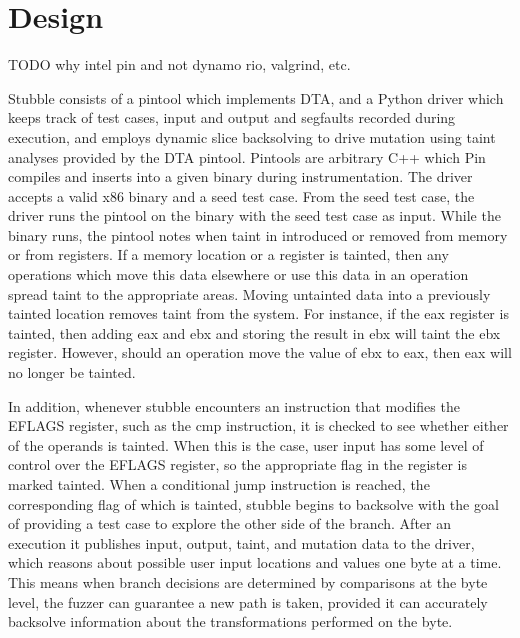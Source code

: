\documentclass[11pt,expanded,copyright]{fsuthesis}
\begin{document}
\section{Design}

TODO why intel pin and not dynamo rio, valgrind, etc.

Stubble consists of a pintool which implements DTA, and a Python driver which keeps track of test cases, input and output and segfaults recorded during execution, and employs dynamic slice backsolving to drive mutation using taint analyses provided by the DTA pintool. Pintools are arbitrary C++ which Pin compiles and inserts into a given binary during instrumentation. The driver accepts a valid x86 binary and a seed test case. From the seed test case, the driver runs the pintool on the binary with the seed test case as input. While the binary runs, the pintool notes when taint in introduced or removed from memory or from registers. If a memory location or a register is tainted, then any operations which move this data elsewhere or use this data in an operation spread taint to the appropriate areas. Moving untainted data into a previously tainted location removes taint from the system. For instance, if the eax register is tainted, then adding eax and ebx and storing the result in ebx will taint the ebx register. However, should an operation move the value of ebx to eax, then eax will no longer be tainted. 

In addition, whenever stubble encounters an instruction that modifies the EFLAGS register, such as the cmp instruction, it is checked to see whether either of the operands is tainted. When this is the case, user input has some level of control over the EFLAGS register, so the appropriate flag in the register is marked tainted. When a conditional jump instruction is reached, the corresponding flag of which is tainted, stubble begins to backsolve with the goal of providing a test case to explore the other side of the branch. After an execution it publishes input, output, taint, and mutation data to the driver, which reasons about possible user input locations and values one byte at a time. This means when branch decisions are determined by comparisons at the byte level, the fuzzer can guarantee a new path is taken, provided it can accurately backsolve information about the transformations performed on the byte.
\end{document}
